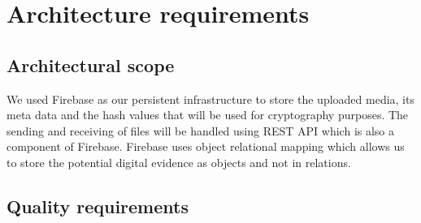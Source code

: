 \documentclass[a4paper,12pt]{article}
\begin{document}
\section{Architecture requirements}
\subsection{Architectural scope}
We used Firebase as our persistent infrastructure to store the uploaded media, its meta data and the hash values that will be used for cryptography purposes.  The sending and receiving of files will be handled using REST API which is also a component of Firebase.  Firebase uses object relational mapping which allows us to store the potential digital evidence as objects and not in relations.

\subsection{Quality requirements}
\end{document}
